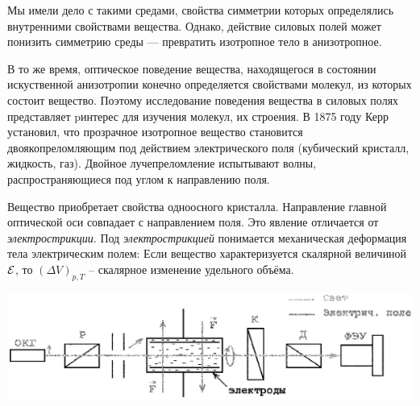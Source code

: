 ﻿
\thispagestyle{empty}

Мы имели дело с такими средами, свойства симметрии которых
определялись внутренними свойствами вещества. Однако, действие
силовых полей может понизить симметрию среды --- превратить
изотропное тело в анизотропное.\par
В то же время, оптическое поведение вещества, находящегося в
состоянии искуственной анизотропии конечно определяется
свойствами молекул, из которых состоит вещество. Поэтому
исследование поведения вещества в силовых полях представляет
pинтерес для изучения молекул, их строения. В 1875 году Керр
установил, что прозрачное изотропное вещество становится
двоякопреломляющим под действием электрического поля (кубический
кристалл, жидкость, газ).
Двойное лучепреломление испытывают волны, распространяющиеся под
углом к направлению поля.\par
Вещество приобретает свойства одноосного кристалла. Направление
главной оптической оси совпадает с направлением поля. Это явление
отличается от {\it электрострикции}. Под {\it электрострикцией} понимается
механическая деформация тела электрическим полем: Если вещество
характеризуется скалярной величиной $\cal E$, то $(\Delta V)_{p,T}$ --
скалярное изменение удельного объёма.

\centerline{\hbox{\includegraphics[scale=0.69]{Ris/ris_eps/eff_kerr/ris1.eps}}}


